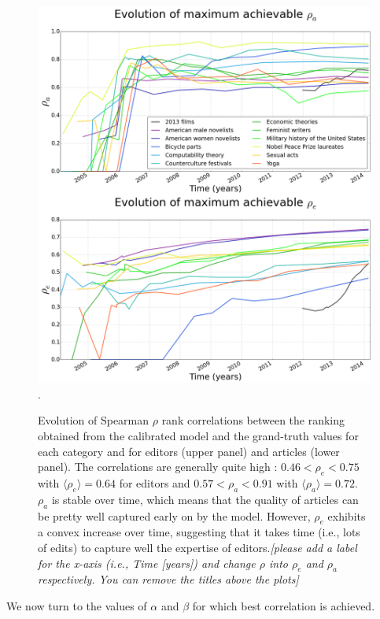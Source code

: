  \begin{figure}[!t]
 \centering
\includegraphics[width=0.9\columnwidth]{Figures/rho_combined.png}.
\caption{Evolution of Spearman $\rho$ rank correlations between the ranking obtained from the calibrated model and the grand-truth values for each category and for editors (upper panel)  and articles (lower panel). The correlations are generally quite high : $ 0.46 < \rho_e < 0.75$ with $\langle \rho_e\rangle = 0.64$ for editors and $0.57 < \rho_a < 0.91$ with $\langle \rho_a\rangle = 0.72$. $\rho_{a}$  is stable over time, which means that the quality of articles can be pretty well captured early on by the model. However, $\rho_e$ exhibits a convex increase over time, suggesting that it takes time (i.e., lots of edits) to capture well the expertise of editors.{\it [please add a label for the x-axis (i.e., Time [years]) and change $\rho$ into $\rho_e$ and $\rho_a$ respectively. You can remove the titles above the  plots]}}
 \label{fig:rhotime}
 \end{figure}



We now turn to the values of $\alpha$ and $\beta$ for which best correlation is achieved.  

